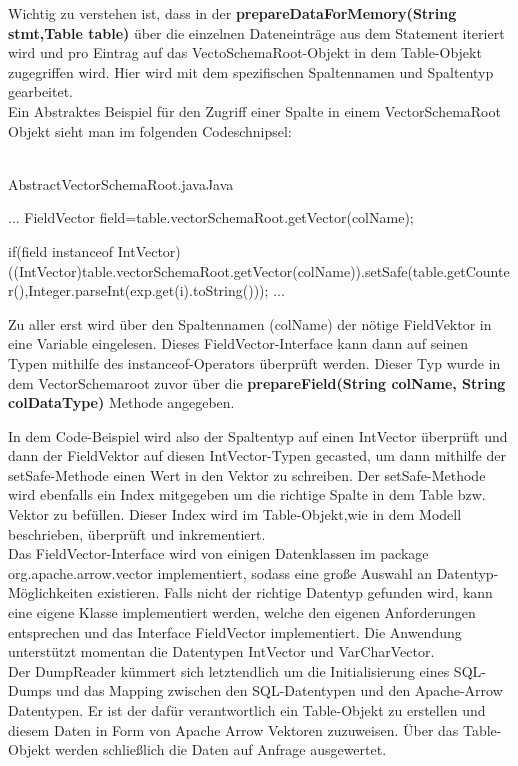Wichtig zu verstehen ist, dass in der \textbf{prepareDataForMemory(String stmt,Table table)} über die einzelnen Dateneinträge aus dem Statement iteriert wird und pro Eintrag auf das VectoSchemaRoot-Objekt in dem Table-Objekt zugegriffen wird. Hier wird mit dem spezifischen Spaltennamen und Spaltentyp gearbeitet.
\\
Ein Abstraktes Beispiel für den Zugriff einer Spalte in einem VectorSchemaRoot Objekt sieht man im folgenden Codeschnipsel:\\\\

\begin{codeblock}{AbstractVectorSchemaRoot.java}{Java}
  \begin{javacode}
    ...
    FieldVector field=table.vectorSchemaRoot.getVector(colName);

    if(field instanceof IntVector){
      ((IntVector)table.vectorSchemaRoot.getVector(colName)).setSafe(table.getCounter(),Integer.parseInt(exp.get(i).toString()));
	}    
    ...
  \end{javacode}
\end{codeblock}

Zu aller erst wird über den Spaltennamen (colName) der nötige FieldVektor in eine Variable eingelesen. Dieses FieldVector-Interface kann dann auf seinen Typen mithilfe des instanceof-Operators überprüft werden. Dieser Typ wurde in dem VectorSchemaroot zuvor über die \textbf{prepareField(String colName, String colDataType)} Methode angegeben.


In dem Code-Beispiel wird also der Spaltentyp auf einen IntVector überprüft und dann der FieldVektor auf diesen IntVector-Typen gecasted, um dann mithilfe der setSafe-Methode einen Wert in den Vektor zu schreiben.
Der setSafe-Methode wird ebenfalls ein Index mitgegeben um  die richtige Spalte in dem Table bzw. Vektor zu befüllen. Dieser Index wird im Table-Objekt,wie in dem Modell beschrieben, überprüft und inkrementiert.
\\
Das FieldVector-Interface wird von einigen Datenklassen im package org.apache.arrow.vector implementiert, sodass eine große Auswahl an Datentyp-Möglichkeiten existieren. Falls nicht der richtige Datentyp gefunden wird, kann eine eigene Klasse implementiert werden, welche den eigenen Anforderungen entsprechen und das Interface FieldVector implementiert.
Die Anwendung unterstützt momentan die Datentypen IntVector und VarCharVector.
\\
Der DumpReader kümmert sich letztendlich um die Initialisierung eines SQL-Dumps und das Mapping zwischen den SQL-Datentypen und den Apache-Arrow Datentypen. Er ist der dafür verantwortlich ein Table-Objekt zu erstellen und diesem Daten  in Form von Apache Arrow Vektoren zuzuweisen.
Über das Table-Objekt werden schließlich die Daten auf Anfrage ausgewertet.





